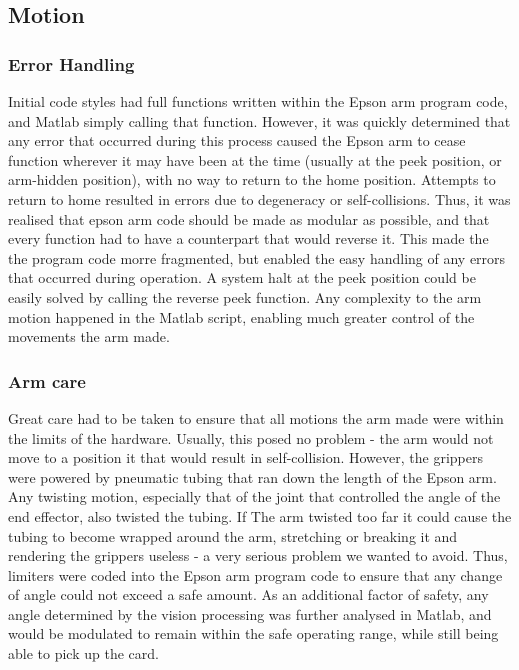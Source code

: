 \subsection{Motion}

\subsubsection{Error Handling}

Initial code styles had full functions written within the Epson arm program code, and Matlab simply calling that function. However, it was quickly determined that any error that occurred during this process caused the Epson arm to cease function wherever it may have been at the time (usually at the peek position, or arm-hidden position), with no way to return to the home position. Attempts to return to home resulted in errors due to degeneracy or self-collisions. Thus, it was realised that epson arm code should be made as modular as possible, and that every function had to have a counterpart that would reverse it. This made the the program code morre fragmented, but enabled the easy handling of any errors that occurred during operation. A system halt at the peek position could be easily solved by calling the reverse peek function. Any complexity to the arm motion happened in the Matlab script, enabling much greater control of the movements the arm made.

\subsubsection{Arm care}

Great care had to be taken to ensure that all motions the arm made were within the limits of the hardware. Usually, this posed no problem - the arm would not move to a position it that would result in self-collision. However, the grippers were powered by pneumatic tubing that ran down the length of the Epson arm. Any twisting motion, especially that of the joint that controlled the angle of the end effector, also twisted the tubing. If The arm twisted too far it could cause the tubing to become wrapped around the arm, stretching or breaking it and rendering the grippers useless - a very serious problem we wanted to avoid. Thus, limiters were coded into the Epson arm program code to ensure that any change of angle could not exceed a safe amount. As an additional factor of safety, any angle determined by the vision processing was further analysed in Matlab, and would be modulated to remain within the safe operating range, while still being able to pick up the card.

